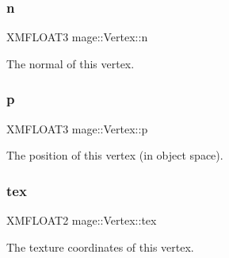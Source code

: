 \subsubsection{\texorpdfstring{n}{n}}
{\footnotesize\ttfamily X\+M\+F\+L\+O\+A\+T3 mage\+::\+Vertex\+::n}

The normal of this vertex. \hypertarget{structmage_1_1_vertex_a9d726a508934b3baccfb01ea912420e7}{}\label{structmage_1_1_vertex_a9d726a508934b3baccfb01ea912420e7} 
\subsubsection{\texorpdfstring{p}{p}}
{\footnotesize\ttfamily X\+M\+F\+L\+O\+A\+T3 mage\+::\+Vertex\+::p}

The position of this vertex (in object space). \hypertarget{structmage_1_1_vertex_a85ae82408f02d64ae567a74efe151188}{}\label{structmage_1_1_vertex_a85ae82408f02d64ae567a74efe151188} 
\subsubsection{\texorpdfstring{tex}{tex}}
{\footnotesize\ttfamily X\+M\+F\+L\+O\+A\+T2 mage\+::\+Vertex\+::tex}

The texture coordinates of this vertex. 